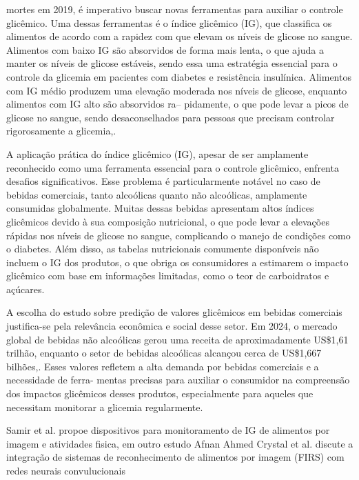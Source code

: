 \documentclass[conference]{IEEEtran}
\begin{document}
mortes em 2019\cite{b3}, é imperativo buscar novas ferramentas 
para auxiliar o controle glicêmico. Uma dessas ferramentas é 
o índice glicêmico (IG), que classifica os alimentos de acordo 
com a rapidez com que elevam os níveis de glicose no sangue. 
Alimentos com baixo IG são absorvidos de forma mais lenta, 
o que ajuda a manter os níveis de glicose estáveis, sendo 
essa uma estratégia essencial para o controle da glicemia em 
pacientes com diabetes e resistência insulínica. Alimentos com 
IG médio produzem uma elevação moderada nos níveis de 
glicose, enquanto alimentos com IG alto são absorvidos ra--
pidamente, o que pode levar a picos de glicose no sangue, 
sendo desaconselhados para pessoas que precisam controlar
rigorosamente a glicemia\cite{b4},\cite{b5}.
\par
A aplicação prática do índice glicêmico (IG), apesar de ser 
amplamente reconhecido como uma ferramenta essencial 
para o controle glicêmico, enfrenta desafios significativos\cite{b6}. 
Esse problema é particularmente notável no caso de bebidas comerciais, 
tanto alcoólicas quanto não alcoólicas, amplamente 
consumidas globalmente. Muitas dessas bebidas apresentam
altos índices glicêmicos devido à sua composição nutricional, 
o que pode levar a elevações rápidas nos níveis de glicose no
sangue, complicando o manejo de condições como o diabetes. 
Além disso, as tabelas nutricionais comumente disponíveis não
incluem o IG dos produtos, o que obriga os consumidores 
a estimarem o impacto glicêmico com base em informações 
limitadas, como o teor de carboidratos e açúcares\cite{b6}.
\par
A escolha do estudo sobre predição de valores glicêmicos 
em bebidas comerciais justifica-se pela relevância econômica e 
social desse setor. Em 2024, o mercado global de bebidas não 
alcoólicas gerou uma receita de aproximadamente US\$1,61
trilhão, enquanto o setor de bebidas alcoólicas alcançou cerca 
de US\$1,667 bilhões\cite{b7},\cite{b8}. Esses valores refletem a alta 
demanda por bebidas comerciais e a necessidade de ferra-
mentas precisas para auxiliar o consumidor na compreensão 
dos impactos glicêmicos desses produtos, especialmente para 
aqueles que necessitam monitorar a glicemia regularmente.
\par
Samir et al.\cite{b44} propoe dispositivos para monitoramento de IG de alimentos por imagem e atividades fisica, em outro estudo Afnan Ahmed Crystal et al.\cite{b45} discute a integração de sistemas de reconhecimento de alimentos por imagem (FIRS) com redes neurais convulucionais 
\end{document}
